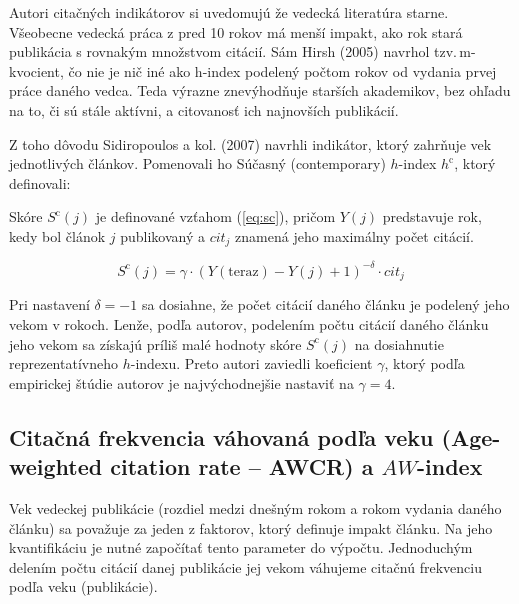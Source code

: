 Autori citačných indikátorov si uvedomujú že vedecká literatúra starne.
Všeobecne vedecká práca z pred 10 rokov má menší impakt, ako rok stará
publikácia s rovnakým množstvom citácií.  Sám Hirsh (2005) navrhol
tzv.\,m-kvocient, čo nie je nič iné ako h-index podelený počtom rokov od vydania
prvej práce daného vedca.  Teda výrazne znevýhodňuje starších akademikov, bez
ohľadu na to, či sú stále aktívni, a citovanosť ich najnovších publikácií.

Z toho dôvodu Sidiropoulos a kol. (2007) navrhli indikátor, ktorý zahrňuje vek
jednotlivých článkov.  Pomenovali ho Súčasný (contemporary) $h$-index
$h^{\mathrm{c}}$, ktorý definovali:


Skóre $S^{\mathrm{c}}(j)$ je definované vzťahom (\ref{eq:sc}), pričom $Y(j)$
predstavuje rok, kedy bol článok $j$ publikovaný a $\mathit{cit}_j$ znamená jeho
maximálny počet citácií.

\begin{equation}
\label{eq:sc}
S^{\mathrm{c}}(j) = \gamma\cdot (Y(\mathrm{teraz}) - Y(j) + 1)^{-\delta}\cdot \mathit{cit}_j
\end{equation}

Pri nastavení $\delta = -1$ sa dosiahne, že počet citácií daného článku je
podelený jeho vekom v rokoch.  Lenže, podľa autorov, podelením počtu citácií
daného článku jeho vekom sa získajú príliš malé hodnoty skóre
$S^{\mathrm{c}}(j)$ na dosiahnutie reprezentatívneho $h$-indexu.  Preto autori
zaviedli koeficient $\gamma$, ktorý podľa empirickej štúdie autorov je
najvýchodnejšie nastaviť na $\gamma = 4$.

\subsection{Citačná frekvencia váhovaná podľa veku (Age-weighted citation rate
  -- AWCR) a $\mathit{AW}$-index}

Vek vedeckej publikácie (rozdiel medzi dnešným rokom a rokom vydania daného
článku) sa považuje za jeden z faktorov, ktorý definuje impakt článku.  Na jeho
kvantifikáciu je nutné započítať tento parameter do výpočtu.  Jednoduchým
delením počtu citácií danej publikácie jej vekom váhujeme citačnú frekvenciu
podľa veku (publikácie).

